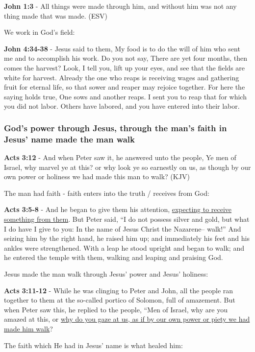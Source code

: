 \documentclass[11pt]{article}
\begin{document}
\textbf{John 1:3} -  All things were made through him, and without him was not any thing made that was made.  (ESV)

We work in God's field:

\textbf{John 4:34-38} - Jesus said to them, My food is to do the will of him who sent me and to accomplish his work. Do you not say, There are yet four months, then comes the harvest? Look, I tell you, lift up your eyes, and see that the fields are white for harvest. Already the one who reaps is receiving wages and gathering fruit for eternal life, so that sower and reaper may rejoice together. For here the saying holds true, One sows and another reaps. I sent you to reap that for which you did not labor. Others have labored, and you have entered into their labor.

\subsubsection{God's power through Jesus, through the man's faith in Jesus' name made the man walk}
\label{sec:org9c79b41}
\textbf{Acts 3:12} - And when Peter saw it, he answered unto the people, Ye men of Israel, why marvel ye at this? or why look ye so earnestly on us, as though by our own power or holiness we had made this man to walk? (KJV)

The man had faith - faith enters into the truth / receives from God:

\textbf{Acts 3:5-8} - And he began to give them his attention, \uline{expecting to receive something from them}. But Peter said, “I do not possess silver and gold, but what I do have I give to you: In the name of Jesus Christ the Nazarene-- walk!” And seizing him by the right hand, he raised him up; and immediately his feet and his ankles were strengthened. With a leap he stood upright and began to walk; and he entered the temple with them, walking and leaping and praising God.

Jesus made the man walk through Jesus' power and Jesus' holiness:

\textbf{Acts 3:11-12} - While he was clinging to Peter and John, all the people ran together to them at the so-called portico of Solomon, full of amazement. But when Peter saw this, he replied to the people, “Men of Israel, why are you amazed at this, or \uline{why do you gaze at us, as if by our own power or piety we had made him walk}?

The faith which He had in Jesus' name is what healed him:
\end{document}
